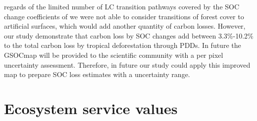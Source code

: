 regards of the limited number of \ac{LC} transition pathways covered by the \ac{SOC} change coefficients of \citep{Don2010} we were not able to consider transitions of forest cover to artificial surfaces, which would add another quantity of carbon losses. However, our study demonstrate that carbon loss by \ac{SOC} changes add between 3.3\%-10.2\% to the total carbon loss by tropical deforestation through \acp{PDD}. In future the \ac{GSOCmap} will be provided to the scientific community with a per pixel uncertainty assessment. Therefore, in future our study could apply this improved map to prepare \ac{SOC} loss estimates with a uncertainty range.

	\section{Ecosystem service values}
